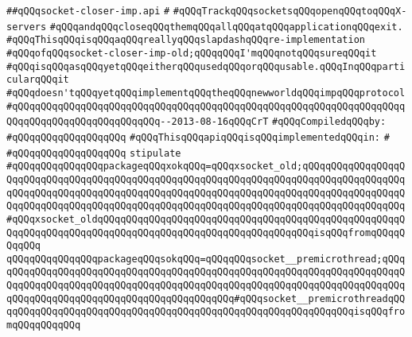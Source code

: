 \label{src/lib/x-kit/xclient/src/wire/socket-closer-imp.api}
\verb|##qQQqsocket-closer-imp.api|\newline
\verb|#|\newline
\verb|#qQQqTrackqQQqsocketsqQQqopenqQQqtoqQQqX-servers|\newline
\verb|#qQQqandqQQqcloseqQQqthemqQQqallqQQqatqQQqapplicationqQQqexit.|\newline
\verb|#qQQqThisqQQqisqQQqaqQQqreallyqQQqslapdashqQQqre-implementation|\newline
\verb|#qQQqofqQQqsocket-closer-imp-old;qQQqqQQqI'mqQQqnotqQQqsureqQQqit|\newline
\verb|#qQQqisqQQqasqQQqyetqQQqeitherqQQqusedqQQqorqQQqusable.qQQqInqQQqparticularqQQqit|\newline
\verb|#qQQqdoesn'tqQQqyetqQQqimplementqQQqtheqQQqnewworldqQQqimpqQQqprotocol|\newline
\verb|#qQQqqQQqqQQqqQQqqQQqqQQqqQQqqQQqqQQqqQQqqQQqqQQqqQQqqQQqqQQqqQQqqQQqqQQqqQQqqQQqqQQqqQQqqQQqqQQq--2013-08-16qQQqCrT|\newline
\newline
\verb|#qQQqCompiledqQQqby:|\newline
\verb|#qQQqqQQqqQQqqQQqqQQq|\newline
\newline
\newline
\verb|#qQQqThisqQQqapiqQQqisqQQqimplementedqQQqin:|\newline
\verb|#|\newline
\verb|#qQQqqQQqqQQqqQQqqQQq|\newline
\newline
\verb|stipulate|\newline
\verb|#qQQqqQQqqQQqqQQqpackageqQQqxokqQQq=qQQqxsocket_old;qQQqqQQqqQQqqQQqqQQqqQQqqQQqqQQqqQQqqQQqqQQqqQQqqQQqqQQqqQQqqQQqqQQqqQQqqQQqqQQqqQQqqQQqqQQqqQQqqQQqqQQqqQQqqQQqqQQqqQQqqQQqqQQqqQQqqQQqqQQqqQQqqQQqqQQqqQQqqQQqqQQqqQQqqQQqqQQqqQQqqQQqqQQqqQQqqQQqqQQqqQQqqQQqqQQqqQQqqQQqqQQqqQQq#qQQqxsocket_oldqQQqqQQqqQQqqQQqqQQqqQQqqQQqqQQqqQQqqQQqqQQqqQQqqQQqqQQqqQQqqQQqqQQqqQQqqQQqqQQqqQQqqQQqqQQqqQQqqQQqqQQqqQQqisqQQqfromqQQqqQQqqQQq|\newline
\verb|qQQqqQQqqQQqqQQqpackageqQQqsokqQQq=qQQqqQQqsocket__premicrothread;qQQqqQQqqQQqqQQqqQQqqQQqqQQqqQQqqQQqqQQqqQQqqQQqqQQqqQQqqQQqqQQqqQQqqQQqqQQqqQQqqQQqqQQqqQQqqQQqqQQqqQQqqQQqqQQqqQQqqQQqqQQqqQQqqQQqqQQqqQQqqQQqqQQqqQQqqQQqqQQqqQQqqQQqqQQqqQQqqQQqqQQq#qQQqsocket__premicrothreadqQQqqQQqqQQqqQQqqQQqqQQqqQQqqQQqqQQqqQQqqQQqqQQqqQQqqQQqqQQqqQQqisqQQqfromqQQqqQQqqQQq|\newline
